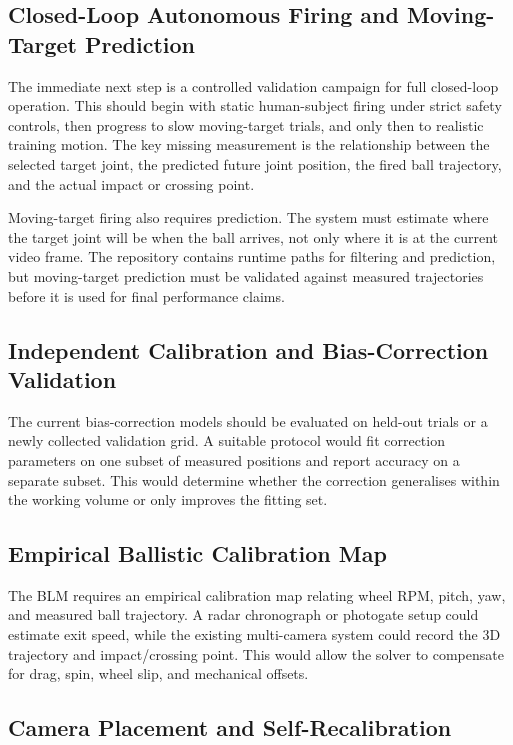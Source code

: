 \subsection{Closed-Loop Autonomous Firing and Moving-Target Prediction}

The immediate next step is a controlled validation campaign for full closed-loop operation. This should begin with static human-subject firing under strict safety controls, then progress to slow moving-target trials, and only then to realistic training motion. The key missing measurement is the relationship between the selected target joint, the predicted future joint position, the fired ball trajectory, and the actual impact or crossing point.

Moving-target firing also requires prediction. The system must estimate where the target joint will be when the ball arrives, not only where it is at the current video frame. The repository contains runtime paths for filtering and prediction, but moving-target prediction must be validated against measured trajectories before it is used for final performance claims.

\subsection{Independent Calibration and Bias-Correction Validation}

The current bias-correction models should be evaluated on held-out trials or a newly collected validation grid. A suitable protocol would fit correction parameters on one subset of measured positions and report accuracy on a separate subset. This would determine whether the correction generalises within the working volume or only improves the fitting set.

\subsection{Empirical Ballistic Calibration Map}

The BLM requires an empirical calibration map relating wheel RPM, pitch, yaw, and measured ball trajectory. A radar chronograph or photogate setup could estimate exit speed, while the existing multi-camera system could record the 3D trajectory and impact/crossing point. This would allow the solver to compensate for drag, spin, wheel slip, and mechanical offsets.

\subsection{Camera Placement and Self-Recalibration}

